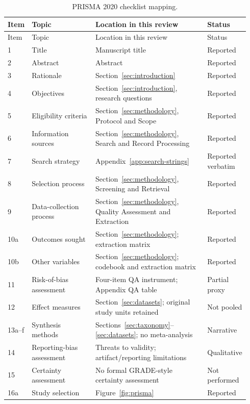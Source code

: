 \small
\begin{longtable}{@{}p{0.06\linewidth}p{0.27\linewidth}p{0.47\linewidth}p{0.14\linewidth}@{}}
\caption{PRISMA 2020 checklist mapping.}\label{tab:prisma-checklist}\\
\toprule
Item & Topic & Location in this review & Status \\
\midrule
\endfirsthead
\toprule
Item & Topic & Location in this review & Status \\
\midrule
\endhead
1 & Title & Manuscript title & Reported \\
2 & Abstract & Abstract & Reported \\
3 & Rationale & Section~\ref{sec:introduction} & Reported \\
4 & Objectives & Section~\ref{sec:introduction}, research questions & Reported \\
5 & Eligibility criteria & Section~\ref{sec:methodology}, Protocol and Scope & Reported \\
6 & Information sources & Section~\ref{sec:methodology}, Search and Record Processing & Reported \\
7 & Search strategy & Appendix~\ref{app:search-strings} & Reported verbatim \\
8 & Selection process & Section~\ref{sec:methodology}, Screening and Retrieval & Reported \\
9 & Data-collection process & Section~\ref{sec:methodology}, Quality Assessment and Extraction & Reported \\
10a & Outcomes sought & Section~\ref{sec:methodology}; extraction matrix & Reported \\
10b & Other variables & Section~\ref{sec:methodology}; codebook and extraction matrix & Reported \\
11 & Risk-of-bias assessment & Four-item QA instrument; Appendix QA table & Partial proxy \\
12 & Effect measures & Section~\ref{sec:datasets}; original study units retained & Not pooled \\
13a--f & Synthesis methods & Sections~\ref{sec:taxonomy}--\ref{sec:datasets}; no meta-analysis & Narrative \\
14 & Reporting-bias assessment & Threats to validity; artifact/reporting limitations & Qualitative \\
15 & Certainty assessment & No formal GRADE-style certainty assessment & Not performed \\
16a & Study selection & Figure~\ref{fig:prisma} & Reported \\

\end{longtable}
